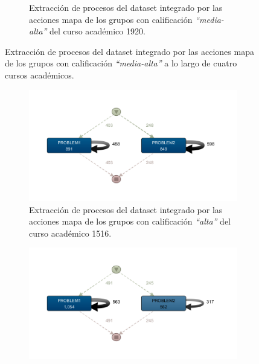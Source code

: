 \begin{figure}[H]
\begin{subfigure}[t]{0.60\textwidth}
    \caption{Extracción de procesos del dataset integrado por las acciones mapa de los grupos con calificación \emph{``media-alta''} del curso académico 1920.}
    \label{fig:mapYear1920MidHighGrades}
  \end{subfigure}
  \caption{Extracción de procesos del dataset integrado por las acciones mapa de los grupos con calificación \emph{``media-alta''} a lo largo de cuatro cursos académicos.}
\end{figure}

\begin{figure}[H]
  \begin{subfigure}[t]{0.60\textwidth}
    \includegraphics[width=1.10\textwidth, height=0.80\textwidth]{imagenes/DISCO_map/Dataset FusionadoYear1516HighGrades.png}
    \caption{Extracción de procesos del dataset integrado por las acciones mapa de los grupos con calificación \emph{``alta''} del curso académico 1516.}
    \label{fig:mapYear1516HighGrades}
  \end{subfigure}
  \hfill
  \begin{subfigure}[t]{0.60\textwidth}
    \includegraphics[width=1.10\textwidth, height=0.80\textwidth]{imagenes/DISCO_map/Dataset FusionadoYear1617HighGrades.png}

\end{subfigure}
\end{figure}
